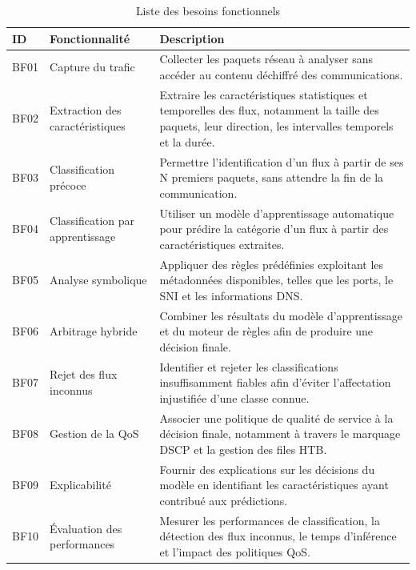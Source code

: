 \begin{table}[H]
\centering
\caption{Liste des besoins fonctionnels}
\label{tab:besoins-fonctionnels}
\small
\begin{tabularx}{\textwidth}{|p{1.4cm}|p{3.2cm}|Y|}
\hline
\textbf{ID} & \textbf{Fonctionnalité} & \textbf{Description} \\
\hline

BF01 & Capture du trafic &
Collecter les paquets réseau à analyser sans accéder au contenu
déchiffré des communications. \\
\hline

BF02 & Extraction des caractéristiques &
Extraire les caractéristiques statistiques et temporelles
des flux, notamment la taille des paquets, leur direction,
les intervalles temporels et la durée. \\
\hline

BF03 & Classification précoce &
Permettre l'identification d'un flux à partir de ses N premiers
paquets, sans attendre la fin de la communication. \\
\hline

BF04 & Classification par apprentissage &
Utiliser un modèle d'apprentissage automatique pour prédire
la catégorie d'un flux à partir des caractéristiques extraites. \\
\hline

BF05 & Analyse symbolique &
Appliquer des règles prédéfinies exploitant les métadonnées
disponibles, telles que les ports, le SNI et les informations DNS. \\
\hline

BF06 & Arbitrage hybride &
Combiner les résultats du modèle d'apprentissage et du moteur
de règles afin de produire une décision finale. \\
\hline

BF07 & Rejet des flux inconnus &
Identifier et rejeter les classifications insuffisamment fiables
afin d'éviter l'affectation injustifiée d'une classe connue. \\
\hline

BF08 & Gestion de la QoS &
Associer une politique de qualité de service à la décision finale,
notamment à travers le marquage DSCP et la gestion des files HTB. \\
\hline

BF09 & Explicabilité &
Fournir des explications sur les décisions du modèle en identifiant
les caractéristiques ayant contribué aux prédictions. \\
\hline

BF10 & Évaluation des performances &
Mesurer les performances de classification, la détection des flux
inconnus, le temps d'inférence et l'impact des politiques QoS. \\
\hline

\end{tabularx}
\end{table}


